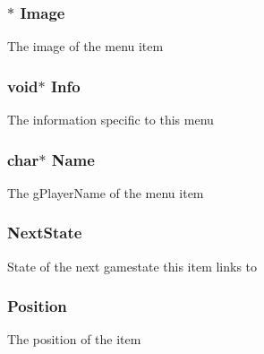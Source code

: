 \subsubsection[{\texorpdfstring{Image}{Image}}]{$\ast$ Image}\hypertarget{structmenu__item__s_a25fe573e4bbeefb06bccb0c0c9acf35f}{}\label{structmenu__item__s_a25fe573e4bbeefb06bccb0c0c9acf35f}
The image of the menu item 
\subsubsection[{\texorpdfstring{Info}{Info}}]{\setlength{\rightskip}{0pt plus 5cm}void$\ast$ Info}\hypertarget{structmenu__item__s_a2459e5f05ca13ac8dff1f7b9abda4534}{}\label{structmenu__item__s_a2459e5f05ca13ac8dff1f7b9abda4534}
The information specific to this menu 
\subsubsection[{\texorpdfstring{Name}{Name}}]{\setlength{\rightskip}{0pt plus 5cm}char$\ast$ Name}\hypertarget{structmenu__item__s_a5e6182c030324511dd82e9fa1a0ab071}{}\label{structmenu__item__s_a5e6182c030324511dd82e9fa1a0ab071}
The g\+Player\+Name of the menu item 
\subsubsection[{\texorpdfstring{Next\+State}{NextState}}]{ Next\+State}\hypertarget{structmenu__item__s_ab0377c6660ff457af3498a0e121e42f0}{}\label{structmenu__item__s_ab0377c6660ff457af3498a0e121e42f0}
State of the next gamestate this item links to 
\subsubsection[{\texorpdfstring{Position}{Position}}]{ Position}\hypertarget{structmenu__item__s_ae69b5c22d5cd3911965dc992d40ba4fc}{}\label{structmenu__item__s_ae69b5c22d5cd3911965dc992d40ba4fc}
The position of the item 
